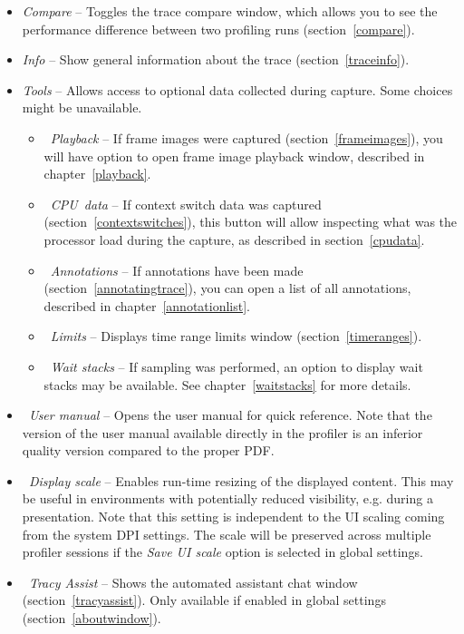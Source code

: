 \documentclass[hidelinks,titlepage,a4paper,twoside]{article}
\begin{document}
\begin{itemize}
\item \emph{\faScaleBalanced{} Compare} -- Toggles the trace compare window, which allows you to see the performance difference between two profiling runs (section~\ref{compare}).
\item \emph{\faFingerprint{} Info} -- Show general information about the trace (section~\ref{traceinfo}).
\item \emph{\faScrewdriverWrench{} Tools} -- Allows access to optional data collected during capture. Some choices might be unavailable.
\begin{itemize}
\item \emph{\faPlay{}~Playback} -- If frame images were captured (section~\ref{frameimages}), you will have option to open frame image playback window, described in chapter~\ref{playback}.
\item \emph{\faSliders{}~CPU~data} -- If context switch data was captured (section~\ref{contextswitches}), this button will allow inspecting what was the processor load during the capture, as described in section~\ref{cpudata}.
\item \emph{\faNoteSticky{}~Annotations} -- If annotations have been made (section~\ref{annotatingtrace}), you can open a list of all annotations, described in chapter~\ref{annotationlist}.
\item \emph{\faRuler{}~Limits} -- Displays time range limits window (section~\ref{timeranges}).
\item \emph{\faHourglassHalf{}~Wait stacks} -- If sampling was performed, an option to display wait stacks may be available. See chapter~\ref{waitstacks} for more details.
\end{itemize}
\item \emph{ \faBook{}~User manual} -- Opens the user manual for quick reference. Note that the version of the user manual available directly in the profiler is an inferior quality version compared to the proper PDF.
\item \emph{\faMagnifyingGlassPlus{}~Display scale} -- Enables run-time resizing of the displayed content. This may be useful in environments with potentially reduced visibility, e.g. during a presentation. Note that this setting is independent to the UI scaling coming from the system DPI settings. The scale will be preserved across multiple profiler sessions if the \emph{Save UI scale} option is selected in global settings.
\item \emph{\faRobot{}~Tracy Assist} -- Shows the automated assistant chat window (section~\ref{tracyassist}). Only available if enabled in global settings (section~\ref{aboutwindow}).
\end{itemize}
\end{document}
